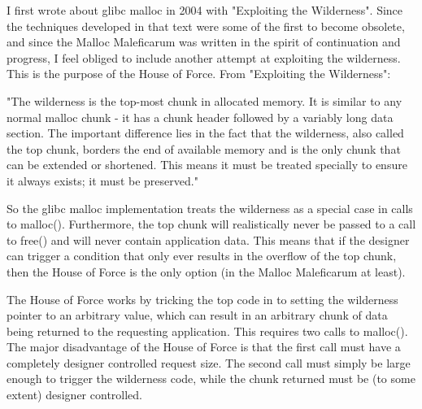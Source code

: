 \documentclass[12pt]{article}
\begin{document}
I first wrote about glibc malloc in 2004 with "Exploiting the
Wilderness". Since the techniques developed in that text were some
of the first to become obsolete, and since the Malloc Maleficarum
was written in the spirit of continuation and progress, I feel
obliged to include another attempt at exploiting the wilderness.
This is the purpose of the House of Force. From "Exploiting the
Wilderness":
\newline


"The wilderness is the top-most chunk in allocated memory. It is
similar to any normal malloc chunk - it has a chunk header followed
by a variably long data section. The important difference lies in
the fact that the wilderness, also called the top chunk, borders
the end of available memory and is the only chunk that can be
extended or shortened. This means it must be treated specially to
ensure it always exists; it must be preserved."
\newline


So the glibc malloc implementation treats the wilderness as a
special case in calls to malloc(). Furthermore, the top chunk will
realistically never be passed to a call to free() and will never
contain application data. This means that if the designer can
trigger a condition that only ever results in the overflow of the
top chunk, then the House of Force is the only option (in the
Malloc Maleficarum at least).
\newline


The House of Force works by tricking the top code in to setting the
wilderness pointer to an arbitrary value, which can result in an
arbitrary chunk of data being returned to the requesting
application. This requires two calls to malloc(). The major
disadvantage of the House of Force is that the first call must have
a completely designer controlled request size. The second call must
simply be large enough to trigger the wilderness code, while the
chunk returned must be (to some extent) designer controlled.
\end{document}
